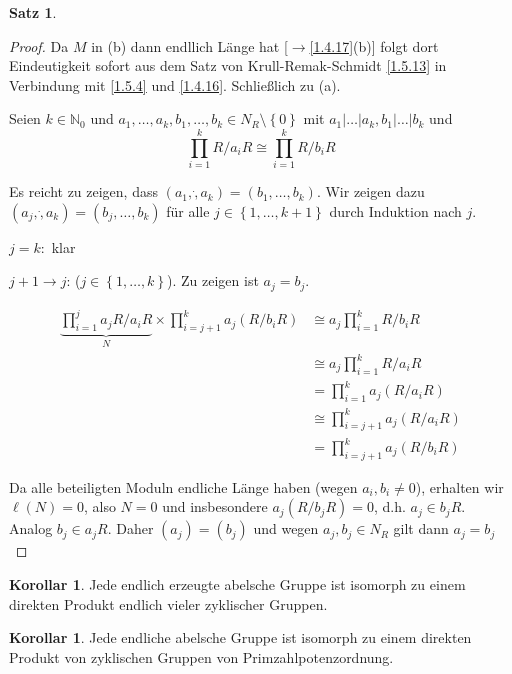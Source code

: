 \documentclass[
twoside=semi,
fontsize=12,
DIV=12, 
cleardoublepage=current,
leqno,
headings=optiontoheadandtoc, 
toc=idx
]{scrbook}
\newcommand{\N}{\mathbb{N}}
\newcommand{\set}[1]{\left\{ #1 \right\}}
\theoremstyle{definition}
\newtheorem{satz}[definition]{Satz}
\newtheorem{korollar}[definition]{Korollar}
\begin{document}
\begin{satz}
\begin{proof}
			Da $M$ in (b) dann endllich L\"ange hat [$\to$\ref{1.4.17}(b)] folgt dort Eindeutigkeit sofort aus dem Satz von Krull-Remak-Schmidt \ref{1.5.13} in Verbindung mit \ref{1.5.4} und \ref{1.4.16}. Schlie\ss lich zu (a).
			
			Seien $k \in \N_0$ und $a_1, \dots, a_k, b_1, \dots, b_k \in N_R \setminus \set{0}$ mit $a_1|\dots|a_k, b_1|\dots|b_k$ und 
				\[\prod_{i=1}^k R/a_iR \cong \prod_{i=1}^kR/b_iR\]
				
			Es reicht zu zeigen, dass $(a_1, \dot, a_k) = (b_1, \dots, b_k)$. Wir zeigen dazu $(a_j, \dot, a_k) = (b_j, \dots, b_k)$ f\"ur alle $j\in \set{1,\dots,k+1}$ durch Induktion nach $j$.
			
			$j=k:$ klar
			
			$j+1\to j$: ($j \in \set{1,\dots,k}$). Zu zeigen ist $a_j = b_j$. 
			
			\begin{align*}
				\underbrace{\prod_{i=1}^j a_jR/a_iR}_{N} \times \prod_{i=j+1}^k a_j(R/b_iR) &\cong a_j \prod_{i=1}^k R/b_iR\\
				&\cong a_j \prod_{i=1}^k R/a_iR\\
				&=\prod_{i=1}^k a_j(R/a_iR)\\
				&\cong \prod_{i=j+1}^k a_j(R/a_iR)\\
				&= \prod_{i=j+1}^k a_j(R/b_iR)
			\end{align*} 
		
			Da alle beteiligten Moduln endliche L\"ange haben (wegen $a_i, b_i \neq 0$), erhalten wir $\ell(N) = 0$, also $N=0$ und insbesondere $a_j(R/b_jR) = 0$, d.h. $a_j \in b_jR$. Analog $b_j \in a_jR$. Daher $(a_j) = (b_j)$ und wegen $a_j, b_j \in N_R$ gilt dann $a_j = b_j$
		\end{proof}
	\end{satz}

	\begin{korollar}\label{1.6.10}
		Jede endlich erzeugte abelsche Gruppe ist isomorph zu einem direkten Produkt endlich vieler zyklischer Gruppen.
	\end{korollar}

	\begin{korollar}\label{1.6.11}
		Jede endliche abelsche Gruppe ist isomorph zu einem direkten Produkt von zyklischen Gruppen von Primzahlpotenzordnung.
	\end{korollar}
\backmatter
\printindex
\end{document}
